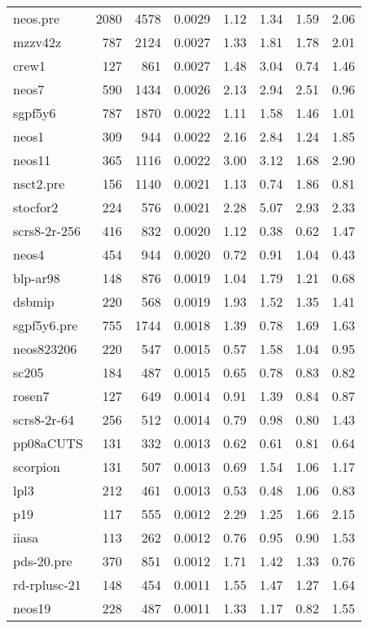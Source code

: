 \documentclass[10pt]{article}
\begin{document}
\begin{longtable}{|l|r|r|r|r|r|r|r|}
neos.pre	&	2080	&	4578	&	0.0029	&	1.12	&	1.34	&	1.59	&	2.06	\\
mzzv42z	&	787	&	2124	&	0.0027	&	1.33	&	1.81	&	1.78	&	2.01	\\
crew1	&	127	&	861	&	0.0027	&	1.48	&	3.04	&	0.74	&	1.46	\\
neos7	&	590	&	1434	&	0.0026	&	2.13	&	2.94	&	2.51	&	0.96	\\
sgpf5y6	&	787	&	1870	&	0.0022	&	1.11	&	1.58	&	1.46	&	1.01	\\
neos1	&	309	&	944	&	0.0022	&	2.16	&	2.84	&	1.24	&	1.85	\\
neos11	&	365	&	1116	&	0.0022	&	3.00	&	3.12	&	1.68	&	2.90	\\
nsct2.pre	&	156	&	1140	&	0.0021	&	1.13	&	0.74	&	1.86	&	0.81	\\
stocfor2	&	224	&	576	&	0.0021	&	2.28	&	5.07	&	2.93	&	2.33	\\
scrs8-2r-256	&	416	&	832	&	0.0020	&	1.12	&	0.38	&	0.62	&	1.47	\\
neos4	&	454	&	944	&	0.0020	&	0.72	&	0.91	&	1.04	&	0.43	\\
blp-ar98	&	148	&	876	&	0.0019	&	1.04	&	1.79	&	1.21	&	0.68	\\
dsbmip	&	220	&	568	&	0.0019	&	1.93	&	1.52	&	1.35	&	1.41	\\
sgpf5y6.pre	&	755	&	1744	&	0.0018	&	1.39	&	0.78	&	1.69	&	1.63	\\
neos823206	&	220	&	547	&	0.0015	&	0.57	&	1.58	&	1.04	&	0.95	\\
sc205	&	184	&	487	&	0.0015	&	0.65	&	0.78	&	0.83	&	0.82	\\
rosen7	&	127	&	649	&	0.0014	&	0.91	&	1.39	&	0.84	&	0.87	\\
scrs8-2r-64	&	256	&	512	&	0.0014	&	0.79	&	0.98	&	0.80	&	1.43	\\
pp08aCUTS	&	131	&	332	&	0.0013	&	0.62	&	0.61	&	0.81	&	0.64	\\
scorpion	&	131	&	507	&	0.0013	&	0.69	&	1.54	&	1.06	&	1.17	\\
lpl3	&	212	&	461	&	0.0013	&	0.53	&	0.48	&	1.06	&	0.83	\\
p19	&	117	&	555	&	0.0012	&	2.29	&	1.25	&	1.66	&	2.15	\\
iiasa	&	113	&	262	&	0.0012	&	0.76	&	0.95	&	0.90	&	1.53	\\
pds-20.pre	&	370	&	851	&	0.0012	&	1.71	&	1.42	&	1.33	&	0.76	\\
rd-rplusc-21	&	148	&	454	&	0.0011	&	1.55	&	1.47	&	1.27	&	1.64	\\
neos19	&	228	&	487	&	0.0011	&	1.33	&	1.17	&	0.82	&	1.55	\\

\end{longtable}
\end{document}
